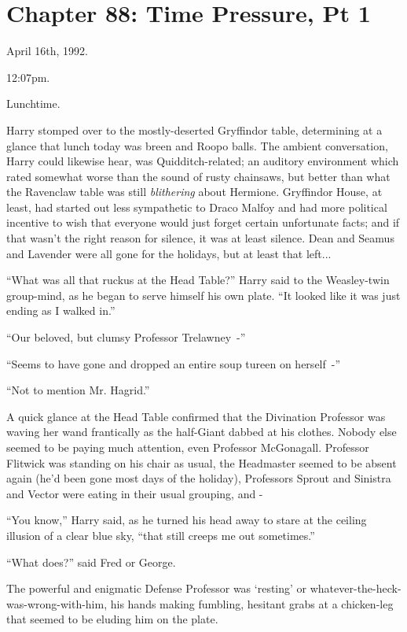\chapter{Chapter 88: Time Pressure, Pt 1}
April 16th, 1992.

12:07pm.

Lunchtime.

Harry stomped over to the mostly-deserted Gryffindor table, determining at a glance that lunch today was breen and Roopo balls. The ambient conversation, Harry could likewise hear, was Quidditch-related; an auditory environment which rated somewhat worse than the sound of rusty chainsaws, but better than what the Ravenclaw table was still \emph{blithering} about Hermione. Gryffindor House, at least, had started out less sympathetic to Draco Malfoy and had more political incentive to wish that everyone would just forget certain unfortunate facts; and if that wasn't the right reason for silence, it was at least silence. Dean and Seamus and Lavender were all gone for the holidays, but at least that left...

``What was all that ruckus at the Head Table?'' Harry said to the Weasley-twin group-mind, as he began to serve himself his own plate. ``It looked like it was just ending as I walked in.''

``Our beloved, but clumsy Professor Trelawney~-''

``Seems to have gone and dropped an entire soup tureen on herself~-''

``Not to mention Mr. Hagrid.''

A quick glance at the Head Table confirmed that the Divination Professor was waving her wand frantically as the half-Giant dabbed at his clothes. Nobody else seemed to be paying much attention, even Professor McGonagall. Professor Flitwick was standing on his chair as usual, the Headmaster seemed to be absent again (he'd been gone most days of the holiday), Professors Sprout and Sinistra and Vector were eating in their usual grouping, and -

``You know,'' Harry said, as he turned his head away to stare at the ceiling illusion of a clear blue sky, ``that still creeps me out sometimes.''

``What does?'' said Fred or George.

The powerful and enigmatic Defense Professor was `resting' or whatever-the-heck-was-wrong-with-him, his hands making fumbling, hesitant grabs at a chicken-leg that seemed to be eluding him on the plate.

